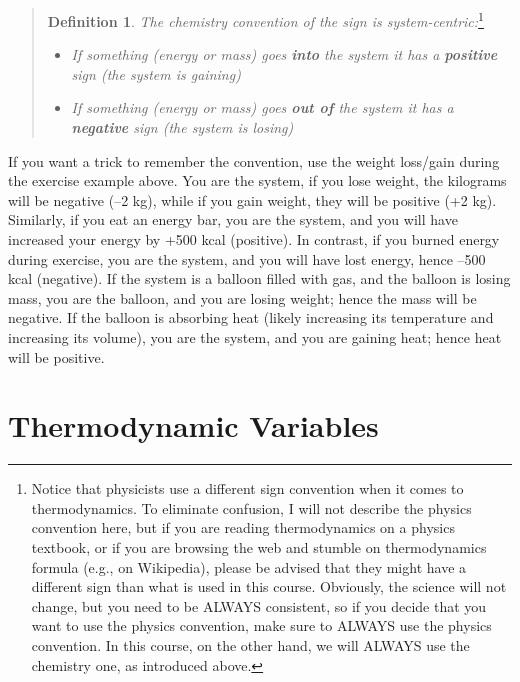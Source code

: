 \documentclass[
]{book}
\providecommand{\tightlist}{%
  \setlength{\itemsep}{0pt}\setlength{\parskip}{0pt}}
\theoremstyle{definition}
\newtheorem{definition}{Definition}[chapter]
\theoremstyle{definition}
\theoremstyle{definition}
\theoremstyle{remark}
\begin{document}
\begin{quote}
\begin{definition}
\protect\hypertarget{def:chemistryconv}{}{\label{def:chemistryconv} }\emph{The chemistry convention of the sign is system-centric:}\footnote{Notice that physicists use a different sign convention when it comes to thermodynamics. To eliminate confusion, I will not describe the physics convention here, but if you are reading thermodynamics on a physics textbook, or if you are browsing the web and stumble on thermodynamics formula (e.g., on Wikipedia), please be advised that they might have a different sign than what is used in this course. Obviously, the science will not change, but you need to be ALWAYS consistent, so if you decide that you want to use the physics convention, make sure to ALWAYS use the physics convention. In this course, on the other hand, we will ALWAYS use the chemistry one, as introduced above.}

\begin{itemize}
\tightlist
\item
  \emph{If something (energy or mass) goes \textbf{into} the system it has a \textbf{positive} sign (the system is gaining)}
\item
  \emph{If something (energy or mass) goes \textbf{out of} the system it has a \textbf{negative} sign (the system is losing)}
\end{itemize}
\end{definition}
\end{quote}

If you want a trick to remember the convention, use the weight loss/gain during the exercise example above. You are the system, if you lose weight, the kilograms will be negative (--2 kg), while if you gain weight, they will be positive (+2 kg). Similarly, if you eat an energy bar, you are the system, and you will have increased your energy by +500 kcal (positive). In contrast, if you burned energy during exercise, you are the system, and you will have lost energy, hence --500 kcal (negative). If the system is a balloon filled with gas, and the balloon is losing mass, you are the balloon, and you are losing weight; hence the mass will be negative. If the balloon is absorbing heat (likely increasing its temperature and increasing its volume), you are the system, and you are gaining heat; hence heat will be positive.

\hypertarget{thermodynamic-variables}{%
\section{Thermodynamic Variables}\label{thermodynamic-variables}}
\end{document}
